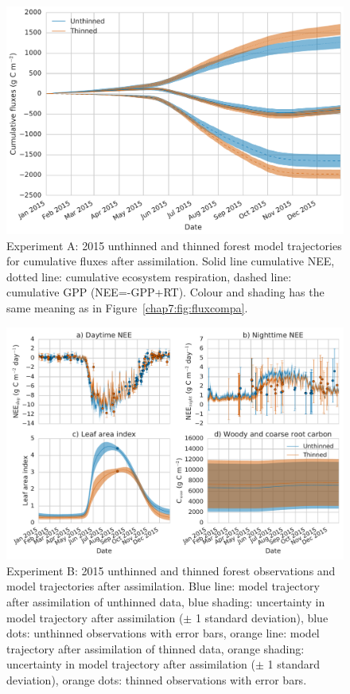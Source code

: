  \begin{figure}
 \noindent\includegraphics[width=30pc]{chapter/chapter7/cum_fluxa.pdf}
\caption{Experiment A: 2015 unthinned and thinned forest model trajectories for cumulative fluxes after assimilation. Solid line cumulative NEE, dotted line: cumulative ecosystem respiration, dashed line: cumulative GPP (NEE=-GPP+RT). Colour and shading has the same meaning as in Figure~\ref{chap7:fig:fluxcompa}.}
 \label{chap7:fig:fluxcuma}
 \end{figure}


 \begin{figure}
 \noindent\includegraphics[width=30pc]{chapter/chapter7/obs_compb.pdf}
\caption{Experiment B: 2015 unthinned and thinned forest observations and model trajectories after assimilation. Blue line: model trajectory after assimilation of unthinned data, blue shading: uncertainty in model trajectory after assimilation (\(\pm\) 1 standard deviation), blue dots: unthinned observations with error bars, orange line: model trajectory after assimilation of thinned data, orange shading: uncertainty in model trajectory after assimilation (\(\pm\) 1 standard deviation), orange dots: thinned observations with error bars.}
 \label{chap7:fig:obscompb}
 \end{figure}
 
